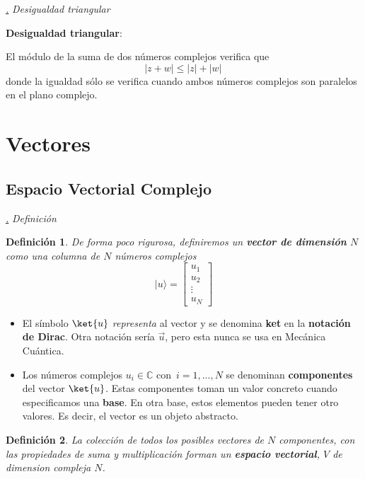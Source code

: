 \documentclass[a4paper,11pt]{book} %
\newtheorem{definicion_contador}{Definición}
\newcommand{\Definicion}[1]{
		\begin{mybox_gray2}{}
			\begin{definicion_contador}
				 #1 
			\end{definicion_contador} 
		\end{mybox_gray2}
	}
\numberwithin{equation}{chapter}
\def\subsubiContadorIt{\par\addtocounter{subsubsection}{1}\underline{\it\thesubsubsection.}\hskip0.5cm \setcounter{subsubsubsectionIt}{0}}
\newcommand{\SubsubiIt}[1]{
		\subsubiContadorIt \textit{#1}
	}
\newcounter{subsubsubsectionIt}[subsubsection]
\begin{document}
			\SubsubiIt{Desigualdad triangular}
			
\begin{mybox_gray2}{}			
\textbf{Desigualdad triangular}:

El módulo de la suma de dos números complejos verifica que
$$
| z+w| \leq |z| + |w| \,
$$
donde la igualdad sólo se verifica cuando ambos números complejos son paralelos en el plano complejo. 
\end{mybox_gray2}
	
	
	
	\section{Vectores}
		
		\subsection{Espacio Vectorial Complejo}
		
			\SubsubiIt{Definición}
			
	\Definicion{
	De forma poco rigurosa, definiremos un \textbf{vector de dimensión} $N$ como una columna de $N$ números complejos 
$$
|u\rangle = \begin{bmatrix} {u_1}\\ {u_2}\\ \vdots \\ {u_N} 
\end{bmatrix}
$$
	}
\begin{itemize}
	\item El símbolo $\ket{u}$  \textit{representa }al vector y se denomina \textbf{ket} en la \textbf{notación de Dirac}. Otra notación sería $\vec{u}$, pero esta nunca se usa en Mecánica Cuántica.

	\item Los números complejos $u_i \in {\mathbb C}$ con $\, i=1,...,N$ se denominan \textbf{componentes} del vector $\ket{u}$. Estas componentes toman un valor concreto cuando especificamos una \textbf{base}. En otra base, estos elementos pueden tener otro valores. Es decir, el vector es un objeto abstracto.
\end{itemize}
			
	\Definicion{
	La colección de todos los posibles vectores de $N$ componentes,  con las  propiedades de suma y multiplicación forman un \textbf{espacio vectorial}, $V$ de dimension compleja $N$.
	}			
\end{document}
